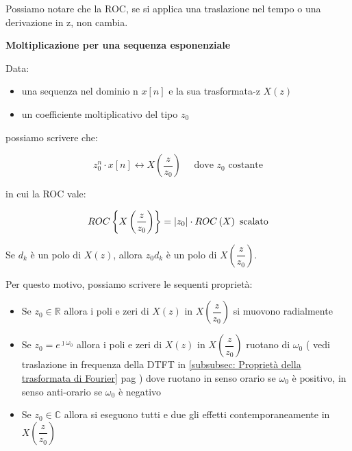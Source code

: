 \begin{tcolorbox}
    Possiamo notare che la ROC, se si applica una traslazione nel tempo o una derivazione in z, 
    non cambia. 
\end{tcolorbox}

\textbf{Moltiplicazione per una sequenza esponenziale} \newline 

Data: 

\begin{itemize}
    \item una sequenza nel dominio n $x \left[ n\right]$ e la sua trasformata-z $X \left( z\right)$ 
    \item un coefficiente moltiplicativo del tipo $z_0$
\end{itemize}

possiamo scrivere che: 

{
    \Large 
    \begin{equation}
        z_0^{n} \cdot x \left[ n\right]
        \leftrightarrow 
        X \left( \dfrac{z}{z_0}\right)
        \quad
        \text{ dove } z_0 \text{ costante}
    \end{equation}
}

in cui la ROC vale: 

{
    \Large 
    \begin{equation}
        ROC \left\{ X \left( \dfrac{z}{z_0}\right) \right\}
        = 
        \abs{z_0} \cdot ROC \left( X\right) \text{ scalato}
    \end{equation}
}

Se $d_k$ è un polo di $X \left(z\right)$, allora $z_0 d_k$ è un polo di $X \left( \dfrac{z}{z_0}\right)$. \newline 

Per questo motivo, possiamo scrivere le sequenti proprietà: 

\begin{itemize}
    \item Se $z_0 \in \mathbb{R}$ allora i poli e zeri di $X \left( z\right)$ in $X \left( \dfrac{z}{z_0}\right)$ si muovono radialmente 
    \item Se $z_0 = e^{\jmath \omega_0}$ allora i poli e zeri di $X \left( z\right)$ in $X \left( \dfrac{z}{z_0}\right)$ ruotano di $\omega_0$ ( vedi traslazione in frequenza della DTFT in \ref{subsubsec: Proprietà della trasformata di Fourier}  pag \pageref{subsubsec: Proprietà della trasformata di Fourier}) dove ruotano in senso orario se $\omega_0$ è positivo, in senso anti-orario se $\omega_0$ è negativo
    \item Se $z_0 \in \mathbb{C}$ allora si eseguono tutti e due gli effetti contemporaneamente in $X \left( \dfrac{z}{z_0}\right)$
\end{itemize}

